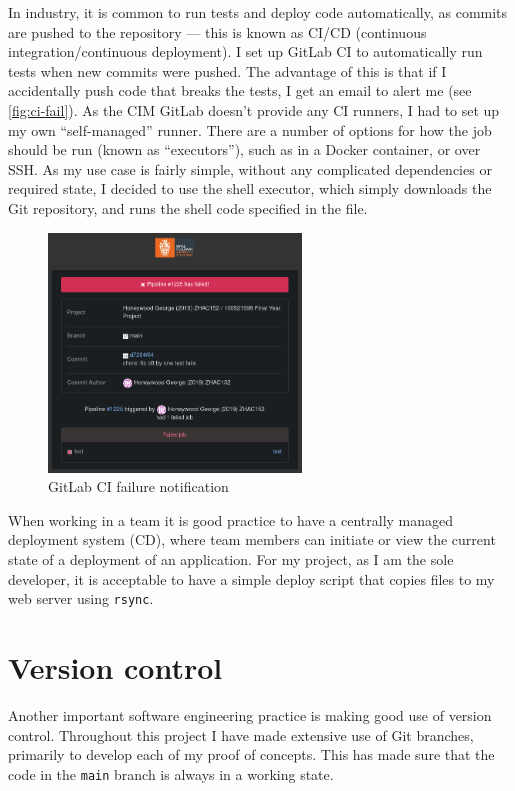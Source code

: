 \documentclass[hyphens]{final_report}
\begin{document}
In industry, it is common to run tests and deploy code automatically, as commits are pushed to the repository --- this is known as CI/CD (continuous integration/continuous deployment). I set up GitLab CI to automatically run tests when new commits were pushed. The advantage of this is that if I accidentally push code that breaks the tests, I get an email to alert me (see \autoref{fig:ci-fail}). As the CIM GitLab doesn't provide any CI runners, I had to set up my own ``self-managed'' runner. There are a number of options for how the job should be run (known as ``executors''), such as in a Docker container, or over SSH\@. As my use case is fairly simple, without any complicated dependencies or required state, I decided to use the shell executor, which simply downloads the Git repository, and runs the shell code specified in the  file.

\begin{figure}[ht]
    \centering
    \includegraphics[width=0.6\textwidth]{images/gitlab-ci-failure.png}
    \caption{GitLab CI failure notification}\label{fig:ci-fail}
\end{figure}

When working in a team it is good practice to have a centrally managed deployment system (CD), where team members can initiate or view the current state of a deployment of an application. For my project, as I am the sole developer, it is acceptable to have a simple deploy script that copies files to my web server using \texttt{rsync}.

\section{Version control}

Another important software engineering practice is making good use of version control. Throughout this project I have made extensive use of Git branches, primarily to develop each of my proof of concepts. This has made sure that the code in the \texttt{main} branch is always in a working state.
\end{document}
